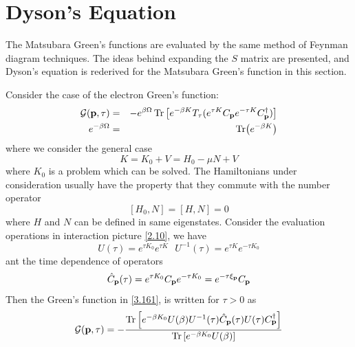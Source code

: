 \section{Dyson's Equation} \label{s3.4}
The Matsubara Green's functions are evaluated by the same method of Feynman diagram techniques.
The ideas behind expanding the $S$ matrix are presented, and Dyson's equation is rederived for the Matsubara Green's function in this section.

Consider the case of the electron Green's function:
\begin{eqnarray}
    \mathcal{G}(\mathbf{p},\tau) &=& -e^{\beta \Omega} \Tr\left[ e^{-\beta K} T_\tau (e^{\tau K} C_{\mathbf{p}}e^{-\tau K} C^\dagger_{\mathbf{p}}) \right] \label{3.161} \\
    e^{-\beta \Omega} &=& \Tr(e^{-\beta K}) \label{3.162}
\end{eqnarray}
where we consider the general case
\begin{equation}
    K = K_0 + V = H_0 -\mu N + V \label{3.163}
\end{equation}
where $K_0$ is a problem which can be solved.
The Hamiltonians under consideration usually have the property that they commute with the number operator
\begin{equation}
    \left[H_0,N\right] = \left[H,N\right] = 0 \label{3.166}
\end{equation}
where $H$ and $N$ can be defined in same eigenstates.
Consider the evaluation operations in interaction picture \eqref{2.10}, we have
\begin{equation}
  U(\tau) = e^{\tau K_0} e^{\tau K} ~ ~ ~ U^{-1}(\tau) = e^{\tau K}e^{-\tau K_0}  \label{3.168}
\end{equation}
ant the time dependence of operators
\begin{equation}
  \hat{C}_{\mathbf{p}} (\tau ) = e^{\tau K_0}C_{\mathbf{p}} e^{-\tau K_0} = e^{-\tau \xi_{\mathbf{p}}} C_{\mathbf{p}} \label{3.169}
\end{equation}
Then the Green's function in \eqref{3.161}, is written for $\tau>0$ as
\begin{equation}
  \mathcal{G}(\mathbf{p},\tau) = -\frac{\Tr\left[ e^{-\beta K_0} U(\beta) U^{-1}(\tau) \hat{C}_{\mathbf{p}}(\tau) U(\tau) C^\dagger_{\mathbf{p}} \right]}{\Tr \left[  e^{-\beta K_0} U(\beta)\right]} \label{3.170}
\end{equation}

